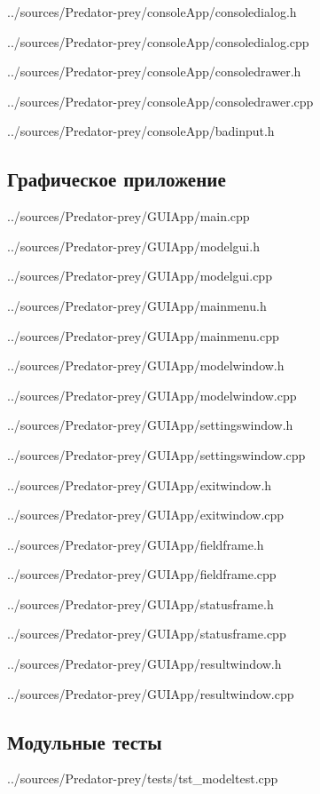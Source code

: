 \documentclass[a4paper]{article}
\begin{document}

{../sources/Predator-prey/consoleApp/consoledialog.h}

{../sources/Predator-prey/consoleApp/consoledialog.cpp}
\newpage


{../sources/Predator-prey/consoleApp/consoledrawer.h}

{../sources/Predator-prey/consoleApp/consoledrawer.cpp}


{../sources/Predator-prey/consoleApp/badinput.h}
\newpage

\subsection{Графическое приложение}


{../sources/Predator-prey/GUIApp/main.cpp}


{../sources/Predator-prey/GUIApp/modelgui.h}

{../sources/Predator-prey/GUIApp/modelgui.cpp}
\newpage


{../sources/Predator-prey/GUIApp/mainmenu.h}

{../sources/Predator-prey/GUIApp/mainmenu.cpp}
\newpage


{../sources/Predator-prey/GUIApp/modelwindow.h}

{../sources/Predator-prey/GUIApp/modelwindow.cpp}
\newpage


{../sources/Predator-prey/GUIApp/settingswindow.h}

{../sources/Predator-prey/GUIApp/settingswindow.cpp}
\newpage


{../sources/Predator-prey/GUIApp/exitwindow.h}

{../sources/Predator-prey/GUIApp/exitwindow.cpp}
\newpage


{../sources/Predator-prey/GUIApp/fieldframe.h}

{../sources/Predator-prey/GUIApp/fieldframe.cpp}
\newpage


{../sources/Predator-prey/GUIApp/statusframe.h}

{../sources/Predator-prey/GUIApp/statusframe.cpp}
\newpage


{../sources/Predator-prey/GUIApp/resultwindow.h}

{../sources/Predator-prey/GUIApp/resultwindow.cpp}

\subsection{Модульные тесты}


{../sources/Predator-prey/tests/tst_modeltest.cpp}
\newpage
\end{document}

